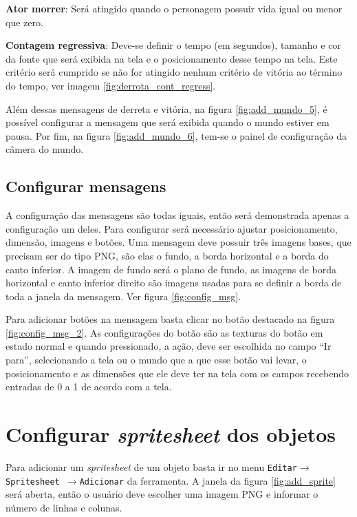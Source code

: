 \documentclass[12pt,oneside,openright,a4paper,english,brazil,sumario=tradicional]{abntex2}
\begin{document}
\begin{anexosenv}
   \begin{alineas}
   \item \textbf{Ator morrer}: Será atingido quando o personagem possuir vida igual ou menor que zero.
   \item \textbf{Contagem regressiva}: Deve-se definir o tempo (em segundos), tamanho e cor da fonte que será exibida na tela e o posicionamento desse tempo na tela. Este critério será cumprido se não for atingido nenhum critério de vitória ao término do tempo, ver imagem \ref{fig:derrota_cont_regress}.
   \end{alineas}

   Além dessas mensagens de derreta e vitória, na figura \ref{fig:add_mundo_5}, é possível configurar a mensagem que será exibida quando o mundo estiver em pausa.
   Por fim, na figura \ref{fig:add_mundo_6}, tem-se o painel de configuração da câmera do mundo.

   \subsection{Configurar mensagens}
   A configuração das mensagens são todas iguais, então será demonstrada apenas a configuração um deles. Para configurar será necessário ajustar posicionamento, dimensão, imagens e botões. Uma mensagem deve possuir três imagens bases, que precisam ser do tipo PNG, são elas o fundo, a borda horizontal e a borda do canto inferior. A imagem de fundo será o plano de fundo, as imagens de borda horizontal e canto inferior direito são imagens usadas para se definir a borda de toda a janela da mensagem. Ver figura \ref{fig:config_msg}.

   Para adicionar botões na mensagem basta clicar no botão destacado na figura \ref{fig:config_msg_2}. As configurações do botão são as texturas do botão em estado normal e quando pressionado, a ação, deve ser escolhida no campo “Ir para”, selecionando a tela ou o mundo que a que esse botão vai levar, o posicionamento e as dimensões que ele deve ter na tela com os campos recebendo entradas de 0 a 1 de acordo com a tela.

   \section{Configurar \emph{spritesheet} dos objetos}
   Para adicionar um \emph{spritesheet} de um objeto basta ir no menu \texttt{Editar$\rightarrow$Spritesheet $\rightarrow$Adicionar} da ferramenta. A janela da figura \ref{fig:add_sprite} será aberta, então o usuário deve escolher uma imagem PNG e informar o número de linhas e colunas.


\end{anexosenv}
\end{document}
